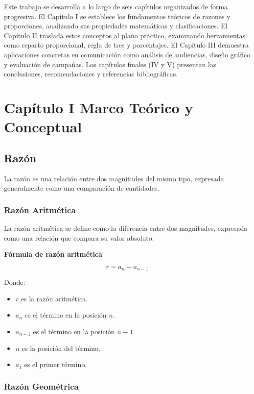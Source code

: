\documentclass[
  stu,
  floatsintext,
  longtable,
  a4paper,
  nolmodern,
  notxfonts,
  notimes,
  colorlinks=true,linkcolor=blue,citecolor=blue,urlcolor=blue]{apa7}
\begin{document}
Este trabajo se desarrolla a lo largo de seis capítulos organizados de
forma progresiva. El Capítulo I se establece los fundamentos teóricos de
razones y proporciones, analizando sus propiedades matemáticas y
clasificaciones. El Capítulo II traslada estos conceptos al plano
práctico, examinando herramientas como reparto proporcional, regla de
tres y porcentajes. El Capítulo III demuestra aplicaciones concretas en
comunicación como análisis de audiencias, diseño gráfico y evaluación de
campañas. Los capítulos finales (IV y V) presentan las conclusiones,
recomendaciones y referencias bibliográficas.

\section{Capítulo I Marco Teórico y
Conceptual}\label{capuxedtulo-i-marco-teuxf3rico-y-conceptual}

\subsection{Razón}\label{razuxf3n}

La razón es una relación entre dos magnitudes del mismo tipo, expresada
generalmente como una comparación de cantidades.

\subsubsection{Razón Aritmética}\label{razuxf3n-aritmuxe9tica}

La razón aritmética se define como la diferencia entre dos magnitudes,
expresada como una relación que compara su valor absoluto.

\textbf{Fórmula de razón aritmética}

\[
r = a_{n} - a_{n-1}
\]

Donde:

\begin{itemize}
\item
  \(r\) es la razón aritmética.
\item
  \(a_{n}\) es el término en la posición \(n\).
\item
  \(a_{n-1}\) es el término en la posición \(n-1\).
\item
  \(n\) es la posición del término.
\item
  \(a_{1}\) es el primer término.
\end{itemize}

\subsubsection{Razón Geométrica}\label{razuxf3n-geomuxe9trica}
\end{document}
